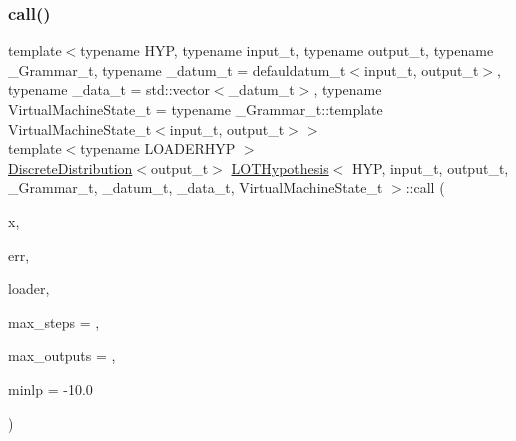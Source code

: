 \subsubsection{\texorpdfstring{call()}{call()}\hspace{0.1cm}{\footnotesize\ttfamily [1/2]}}
{\footnotesize\ttfamily template$<$typename H\+YP, typename input\+\_\+t, typename output\+\_\+t, typename \+\_\+\+Grammar\+\_\+t, typename \+\_\+datum\+\_\+t = defauldatum\+\_\+t$<$input\+\_\+t, output\+\_\+t$>$, typename \+\_\+data\+\_\+t = std\+::vector$<$\+\_\+datum\+\_\+t$>$, typename Virtual\+Machine\+State\+\_\+t = typename \+\_\+\+Grammar\+\_\+t\+::template Virtual\+Machine\+State\+\_\+t$<$input\+\_\+t, output\+\_\+t$>$$>$ \\
template$<$typename L\+O\+A\+D\+E\+R\+H\+YP $>$ \\
\hyperlink{class_discrete_distribution}{Discrete\+Distribution}$<$output\+\_\+t$>$ \hyperlink{class_l_o_t_hypothesis}{L\+O\+T\+Hypothesis}$<$ H\+YP, input\+\_\+t, output\+\_\+t, \+\_\+\+Grammar\+\_\+t, \+\_\+datum\+\_\+t, \+\_\+data\+\_\+t, Virtual\+Machine\+State\+\_\+t $>$\+::call (\begin{DoxyParamCaption}\item[{const input\+\_\+t}]{x,  }\item[{const output\+\_\+t}]{err,  }\item[{L\+O\+A\+D\+E\+R\+H\+YP $\ast$}]{loader,  }\item[{unsigned long}]{max\+\_\+steps = {},  }\item[{unsigned long}]{max\+\_\+outputs = {},  }\item[{double}]{minlp = {\ttfamily -\/10.0} }\end{DoxyParamCaption})\hspace{0.3cm}{\ttfamily [inline]}}

\mbox{\label{class_l_o_t_hypothesis_a3e46160113b9602cff4c4765c768b57d}} 
